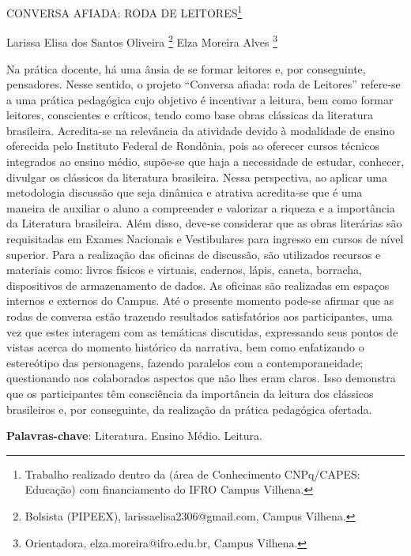 \documentclass[article,12pt,onesidea,4paper,english,brazil]{abntex2}
\begin{document}
	
	
	\frenchspacing 
	
	\begin{center}
		\LARGE CONVERSA AFIADA: RODA DE LEITORES\footnote{Trabalho realizado dentro da (área de Conhecimento CNPq/CAPES: Educação) com financiamento do IFRO Campus Vilhena.}
		
		\normalsize
		Larissa Elisa dos Santos Oliveira \footnote{Bolsista (PIPEEX), larissaelisa2306@gmail.com, Campus Vilhena.} 
		Elza Moreira Alves \footnote{Orientadora, elza.moreira@ifro.edu.br, Campus Vilhena.} 
	
	\end{center}
	
	\noindent Na prática docente, há uma ânsia de se formar leitores e, por conseguinte, pensadores. Nesse sentido, o projeto “Conversa afiada: roda de Leitores” refere-se a uma prática pedagógica cujo objetivo é incentivar a leitura, bem como formar leitores, conscientes e críticos, tendo como base obras clássicas da literatura brasileira. Acredita-se na relevância da atividade devido à modalidade de ensino oferecida pelo Instituto Federal de Rondônia, pois ao oferecer cursos técnicos integrados ao ensino médio, supõe-se que haja a necessidade de estudar, conhecer, divulgar os clássicos da literatura brasileira. Nessa perspectiva, ao aplicar uma metodologia discussão que seja dinâmica e atrativa acredita-se que é uma maneira de auxiliar o aluno a compreender e valorizar a riqueza e a importância da Literatura brasileira. Além disso, deve-se considerar que as obras literárias são requisitadas em Exames Nacionais e Vestibulares para ingresso em cursos de nível superior. Para a realização das oficinas de discussão, são utilizados recursos e materiais como: livros físicos e virtuais, cadernos, lápis, caneta, borracha, dispositivos de armazenamento de dados. As oficinas são realizadas em espaços internos e externos do Campus. Até o presente momento pode-se afirmar que as rodas de conversa estão trazendo resultados satisfatórios aos participantes, uma vez que estes interagem com as temáticas discutidas, expressando seus pontos de vistas acerca do momento histórico da narrativa, bem como enfatizando o estereótipo das personagens, fazendo paralelos com a contemporaneidade; questionando aos colaborados aspectos que não lhes eram claros. Isso demonstra 	que os participantes têm consciência da importância da leitura dos clássicos brasileiros e, por conseguinte, da realização da prática pedagógica ofertada.
	
	\vspace{\onelineskip}
	
	\noindent
	\textbf{Palavras-chave}: Literatura. Ensino Médio. Leitura.
	
\end{document}
